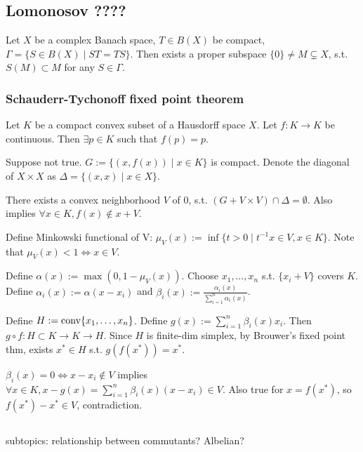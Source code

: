 \documentclass[12pt]{article} %
\begin{document}
\subsection{Lomonosov ????} 
Let $X$ be a complex Banach space, $T\in B(X)$ be compact, $\Gamma =\{ S\in B(X) \mid ST = TS \}$. Then exists a proper subspace $\{0\} \ne M  \subsetneq X$, s.t. $S(M) \subset M$ for any $S\in \Gamma$.

\subsubsection{Schauderr-Tychonoff fixed point theorem}
Let $K$ be a compact convex subset of a Hausdorff space $X$. Let $f: K \to K$ be continuous. Then $\exists p\in K$ such that $f(p)=p$.


\Prf Suppose not true. $G:=\{ (x, f(x)) \mid x \in K \}$ is compact. Denote the diagonal of $X \times X$ as $\Delta = \{ (x, x) \mid x\in X \}$. 

There exists a convex neighborhood $V$ of $0$, s.t. $(G + V\times V) \cap \Delta = \emptyset$. Also implies $\forall x \in K, f(x) \notin x+V$. 

Define Minkowski functional of V: $\mu_V(x):= \inf \{t>0 \mid t^{-1}x \in V, x\in K\}$. Note that $\mu_V(x) < 1 \Leftrightarrow x\in V$. 

Define $\alpha(x) := \max (0, 1-\mu_V(x))$. Choose $x_1,\dots, x_n$ s.t. $\{x_i+V\}$ covers $K$. Define $\alpha_i(x):= \alpha(x-x_i)$ and $\beta_i(x) := \frac{\alpha_i(x)}{\sum_{i=1}^n \alpha_i(x)}$. 

Define $H := \text{conv} \{x_1,\dots,x_n\}$. Define $g(x):=\sum_{i=1}^n \beta_i(x)x_i$. Then $g\circ f : H \subset K \to K \to H$. Since $H$ is finite-dim simplex, by Brouwer's fixed point thm, exists $x^* \in H$ s.t. $g(f(x^*)) = x^*$.

$\beta_i(x)=0 \Leftrightarrow x - x_i \notin V$ implies $\forall x\in K, x-g(x) = \sum_{i=1}^n \beta_i(x)(x-x_i) \in V$. Also true for $x=f(x^*)$, so $f(x^*) - x^* \in V$, contradiction. \QED

\subsection{}

subtopics: relationship between commutants? Albelian?




\end{document}
